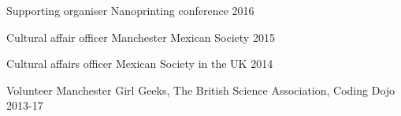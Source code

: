 \begin{cvpress}
\cvpres
{Supporting organiser} %
{Nanoprinting conference} %
{2016} %


\cvpres
{Cultural affair officer}
{Manchester Mexican Society}
{2015}

\cvpres
{Cultural affairs officer}
{Mexican Society in the UK}
{2014}


\cvpres
{Volunteer} %
{Manchester Girl Geeks, The British Science Association, Coding Dojo} %
{2013-17} %


\end{cvpress}